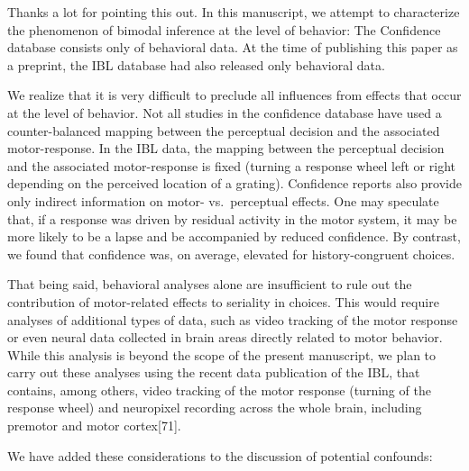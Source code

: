 \documentclass[
]{article}
\begin{document}
Thanks a lot for pointing this out. In this manuscript, we attempt to
characterize the phenomenon of bimodal inference at the level of
behavior: The Confidence database consists only of behavioral data. At
the time of publishing this paper as a preprint, the IBL database had
also released only behavioral data.

We realize that it is very difficult to preclude all influences from
effects that occur at the level of behavior. Not all studies in the
confidence database have used a counter-balanced mapping between the
perceptual decision and the associated motor-response. In the IBL data,
the mapping between the perceptual decision and the associated
motor-response is fixed (turning a response wheel left or right
depending on the perceived location of a grating). Confidence reports
also provide only indirect information on motor- vs.~perceptual effects.
One may speculate that, if a response was driven by residual activity in
the motor system, it may be more likely to be a lapse and be accompanied
by reduced confidence. By contrast, we found that confidence was, on
average, elevated for history-congruent choices.

That being said, behavioral analyses alone are insufficient to rule out
the contribution of motor-related effects to seriality in choices. This
would require analyses of additional types of data, such as video
tracking of the motor response or even neural data collected in brain
areas directly related to motor behavior. While this analysis is beyond
the scope of the present manuscript, we plan to carry out these analyses
using the recent data publication of the IBL, that contains, among
others, video tracking of the motor response (turning of the response
wheel) and neuropixel recording across the whole brain, including
premotor and motor cortex{[}71{]}.

We have added these considerations to the discussion of potential
confounds:
\end{document}
